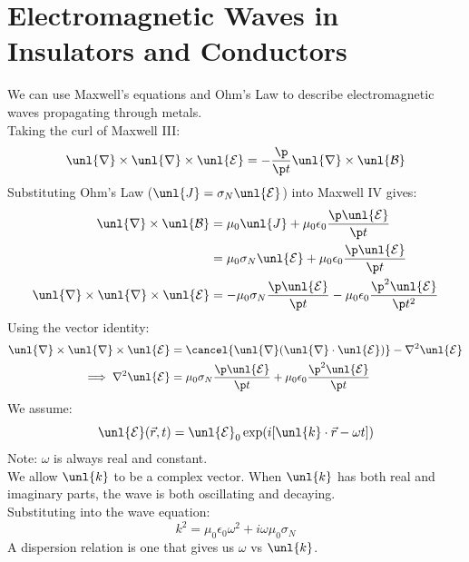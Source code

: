 \documentclass[a4paper, 11pt, normalem]{report}
\renewcommand\E{\mathcal{E}}
\newcommand\uE{\unl{\E}}
\renewcommand\B{\mathcal{B}}
\newcommand\uB{\unl{\B}}
\renewcommand\del{\unl{\nabla}}
\newcommand\eno{\epsilon_0}
\newcommand\vk{\unl{k}}
\newcommand\J{\unl{J}}
\begin{document}
\section{Electromagnetic Waves in Insulators and Conductors}
We can use Maxwell's equations and Ohm's Law to describe electromagnetic waves propagating through metals. \\
Taking the curl of Maxwell \RN{3}:
\begin{equation}
    \del \times \del \times \uE = -\frac{\p}{\p t}\del \times \uB
\end{equation}
Substituting Ohm's Law ($\J = \sigma_N\uE$) into Maxwell \RN{4} gives:
\begin{align}
    \del\times\uB &= \mu_0\J + \mu_0\eno\frac{\p \uE}{\p t} \\
    &= \mu_0\sigma_N\uE + \mu_0\eno\frac{\p\uE}{\p t} \\
    \del \times \del \times \uE &= -\mu_0\sigma_N\frac{\p\uE}{\p t} - \mu_0\eno\frac{\p^2\uE}{\p t^2}
\end{align}
Using the vector identity:
\begin{align}
    \del\times\del\times\uE &= \cancel{\del(\del\cdot\uE)} - \nabla^2\uE \\
    \implies \nabla^2\uE &= \mu_0\sigma_N\frac{\p\uE}{\p t} + \mu_0\eno\frac{\p^2\uE}{\p t}
\end{align}
We assume:
\begin{equation}
    \uE(\vec{r},t) = \uE_0\exp(i[\vk\cdot\vec{r}-\omega t])
\end{equation}
Note: $\omega$ is always real and constant. \\
We allow $\vk$ to be a complex vector.
When $\vk$ has both real and imaginary parts, the wave is both oscillating and decaying. \\
Substituting into the wave equation:
\begin{equation}
    k^2 = \mu_0\eno\omega^2 + i\omega\mu_0\sigma_N \tag{Dispersion Relation}
\end{equation}
A dispersion relation is one that gives us $\omega$ vs $\vk$.
\end{document}
